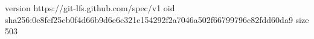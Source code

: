 version https://git-lfs.github.com/spec/v1
oid sha256:0e8fcf25cb0f4d66b9d6e6c321e154292f2a7046a502f66799796c82fdd60da9
size 503
